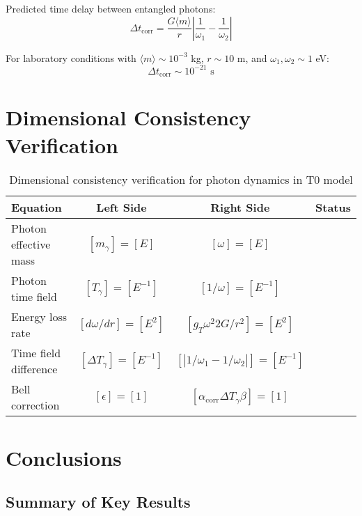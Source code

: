 \documentclass[12pt,a4paper]{article}
\begin{document}
	Predicted time delay between entangled photons:
	\begin{equation}
		\Delta t_{\text{corr}} = \frac{G\langle m \rangle}{r} \left|\frac{1}{\omega_1} - \frac{1}{\omega_2}\right|
		\label{eq:correlation_time_delay}
	\end{equation}
	
	For laboratory conditions with $\langle m \rangle \sim 10^{-3}$ kg, $r \sim 10$ m, and $\omega_1,\omega_2 \sim 1$ eV:
	\begin{equation}
		\Delta t_{\text{corr}} \sim 10^{-21} \text{ s}
		\label{eq:laboratory_delay}
	\end{equation}
	

	\section{Dimensional Consistency Verification}
	
	\begin{table}[htbp]
		\centering
		\begin{tabular}{lccl}
			\toprule
			\textbf{Equation} & \textbf{Left Side} & \textbf{Right Side} & \textbf{Status} \\
			\midrule
			Photon effective mass & $[m_\gamma] = [E]$ & $[\omega] = [E]$ & \checkmark \\
			Photon time field & $[T_\gamma] = [E^{-1}]$ & $[1/\omega] = [E^{-1}]$ & \checkmark \\
			Energy loss rate & $[d\omega/dr] = [E^2]$ & $[g_T \omega^2 2G/r^2] = [E^2]$ & \checkmark \\
			Time field difference & $[\Delta T_\gamma] = [E^{-1}]$ & $[|1/\omega_1 - 1/\omega_2|] = [E^{-1}]$ & \checkmark \\
			Bell correction & $[\epsilon] = [1]$ & $[\alpha_{\text{corr}} \Delta T_\gamma \beta] = [1]$ & \checkmark \\
			\bottomrule
		\end{tabular}
		\caption{Dimensional consistency verification for photon dynamics in T0 model}
	\end{table}
	
	\section{Conclusions}
	
	\subsection{Summary of Key Results}
	
\end{document}
